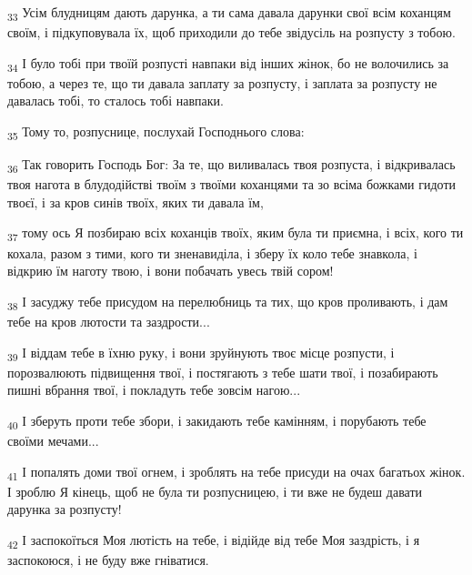 \begin{tcolorbox}
\textsubscript{33} Усім блудницям дають дарунка, а ти сама давала дарунки свої всім коханцям своїм, і підкуповувала їх, щоб приходили до тебе звідусіль на розпусту з тобою.
\end{tcolorbox}
\begin{tcolorbox}
\textsubscript{34} І було тобі при твоїй розпусті навпаки від інших жінок, бо не волочились за тобою, а через те, що ти давала заплату за розпусту, і заплата за розпусту не давалась тобі, то сталось тобі навпаки.
\end{tcolorbox}
\begin{tcolorbox}
\textsubscript{35} Тому то, розпуснице, послухай Господнього слова:
\end{tcolorbox}
\begin{tcolorbox}
\textsubscript{36} Так говорить Господь Бог: За те, що виливалась твоя розпуста, і відкривалась твоя нагота в блудодійстві твоїм з твоїми коханцями та зо всіма божками гидоти твоєї, і за кров синів твоїх, яких ти давала їм,
\end{tcolorbox}
\begin{tcolorbox}
\textsubscript{37} тому ось Я позбираю всіх коханців твоїх, яким була ти приємна, і всіх, кого ти кохала, разом з тими, кого ти зненавиділа, і зберу їх коло тебе знавкола, і відкрию їм наготу твою, і вони побачать увесь твій сором!
\end{tcolorbox}
\begin{tcolorbox}
\textsubscript{38} І засуджу тебе присудом на перелюбниць та тих, що кров проливають, і дам тебе на кров лютости та заздрости...
\end{tcolorbox}
\begin{tcolorbox}
\textsubscript{39} І віддам тебе в їхню руку, і вони зруйнують твоє місце розпусти, і порозвалюють підвищення твої, і постягають з тебе шати твої, і позабирають пишні вбрання твої, і покладуть тебе зовсім нагою...
\end{tcolorbox}
\begin{tcolorbox}
\textsubscript{40} І зберуть проти тебе збори, і закидають тебе камінням, і порубають тебе своїми мечами...
\end{tcolorbox}
\begin{tcolorbox}
\textsubscript{41} І попалять доми твої огнем, і зроблять на тебе присуди на очах багатьох жінок. І зроблю Я кінець, щоб не була ти розпусницею, і ти вже не будеш давати дарунка за розпусту!
\end{tcolorbox}
\begin{tcolorbox}
\textsubscript{42} І заспокоїться Моя лютість на тебе, і відійде від тебе Моя заздрість, і я заспокоюся, і не буду вже гніватися.
\end{tcolorbox}
